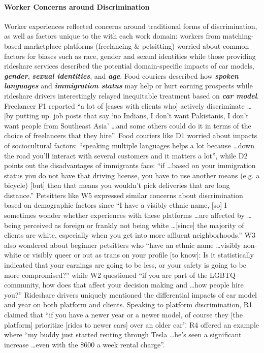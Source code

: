\paragraph{Worker Concerns around Discrimination} Worker experiences reflected concerns around traditional forms of discrimination, as well as factors unique to the with each work {domain}: workers from matching-based marketplace platforms (freelancing \& petsitting) worried about common factors for biases such as race, gender and sexual identities while those providing rideshare services described the potential {domain-specific} impacts of car models, \textit{\textbf{gender}}, \textit{\textbf{sexual identities}}, and \textit{\textbf{age}}. Food couriers described how \textit{\textbf{spoken languages}} and \textit{\textbf{immigration status}} may help or hurt earning prospects while rideshare drivers interestingly relayed inequitable treatment based on \textit{\textbf{car model}}. Freelancer F1 report{ed} ``a lot of { [cases with clients who] }actively discriminate \dots [by putting up] job posts {that} say ‘no Indians, I don't want Pakistanis, I don't want people from Southeast Asia'  \dots   and some others could do it in terms of the choice of freelancers that they hire''. 
Food couriers {like D1} worried about impacts of {sociocultural factors:} ``speaking multiple languages helps a lot because  \dots  down the road you'll interact with several customers and it matters a lot'', {while} D2  {points out the disadvantages of immigrants face:}  ``if \dots  based on your immigration status you do not have that driving license, you have to use another means (e.g. a bicycle) {[but]} then that means you wouldn't pick deliveries that are long distance.'' Petsitters like W5 { expressed similar concerns about} discrimination {based on demographic factors} {since }``I have a visibly ethnic name, [so] I sometimes wonder whether experiences with these platforms  \dots  are affected by  \dots  being perceived as foreign or frankly not being white  \dots [since] the majority of clients are white, especially when you get into more affluent neighborhoods.'' W3 {also wondered about} beginner petsitters who ``have an ethnic name  \dots  visibly non-white or visibly queer or out as trans on your profile [to know]: Is it statistically indicated that your earnings are going to be less, or your safety is going to be more compromised?'' while W2 {questioned} ``if you are part of the LGBTQ community, how does that affect your decision making and \dots how people hire you?'' 
Rideshare drivers uniquely mentioned {the differential }impact{s of car model and year} {on both} platform and clients. Speaking to platform discrimination, R1 claimed that ``if you have a newer year or a newer model, of course they [the platform] prioritize [{rides} to newer cars] over an older car''. R4 {offered an example where} ``my buddy just started renting through Tesla  \dots  he's seen a significant increase \dots  even with the \$600 a week rental charge''. 

